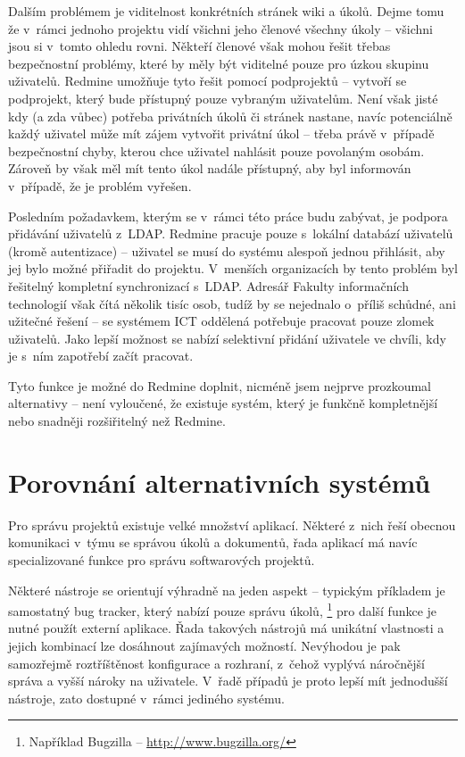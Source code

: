 \documentclass[thesis=B,czech]{FITthesis}[2012/05/02]
\begin{document}
Dalším problémem je viditelnost konkrétních stránek wiki a úkolů. Dejme
tomu že v~rámci jednoho projektu vidí všichni jeho členové všechny
úkoly -- všichni jsou si v~tomto ohledu rovni. Někteří
členové však mohou řešit třebas bezpečnostní problémy,
které by měly být viditelné pouze pro úzkou skupinu uživatelů. Redmine
umožňuje tyto  řešit pomocí podprojektů --
vytvoří se podprojekt, který bude přístupný pouze vybraným uživatelům.
Není však jisté kdy (a zda vůbec) potřeba privátních úkolů či stránek
nastane, navíc potenciálně každý uživatel může mít zájem vytvořit
privátní úkol -- třeba právě v~případě bezpečnostní chyby, kterou chce
uživatel nahlásit pouze povolaným osobám. Zároveň by však měl mít tento
úkol nadále přístupný, aby byl informován v~případě, že je problém
vyřešen.

Posledním požadavkem, kterým se v~rámci této práce budu zabývat, je
podpora přidávání uživatelů z~\gls{LDAP}. Redmine
pracuje pouze s~lokální databází uživatelů (kromě autentizace) -- uživatel se musí do
systému alespoň jednou přihlásit, aby jej bylo možné přiřadit do
projektu. V~menších organizacích by tento problém byl řešitelný
kompletní synchronizací s~\gls{LDAP}. Adresář Fakulty informačních
technologií však čítá několik tisíc osob, tudíž by se nejednalo o~příliš
schůdné, ani užitečné řešení -- se systémem ICT oddělená potřebuje
pracovat pouze zlomek uživatelů. Jako lepší možnost se nabízí selektivní
přidání uživatele ve chvíli, kdy je s~ním zapotřebí začít pracovat.

Tyto funkce je možné do Redmine doplnit, nicméně jsem nejprve prozkoumal
alternativy -- není vyloučené, že existuje systém, který je funkčně
kompletnější nebo snadněji rozšiřitelný než Redmine.

\chapter{Porovnání alternativních systémů}

Pro správu projektů existuje velké množství aplikací. Některé z~nich
řeší obecnou komunikaci v~týmu se správou úkolů a dokumentů, řada
aplikací má navíc specializované funkce pro správu softwarových
projektů.

Některé nástroje se orientují výhradně na jeden aspekt -- typickým
příkladem je samostatný \gls{bug tracker}, který nabízí pouze správu úkolů,
\footnote{Například Bugzilla -- \url{http://www.bugzilla.org/}}
pro další funkce je nutné použít externí aplikace. Řada takových nástrojů má
unikátní vlastnosti a jejich kombinací lze dosáhnout zajímavých
možností. Nevýhodou je pak samozřejmě roztříštěnost konfigurace a
rozhraní, z~čehož vyplývá náročnější správa a vyšší nároky na uživatele.
V~řadě případů je proto lepší mít jednodušší nástroje, zato dostupné
v~rámci jediného systému.
\end{document}

